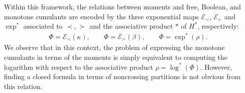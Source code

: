 Within this framework, the relations between moments and free, Boolean, and monotone cumulants are encoded by the three exponential maps $\mathcal{E}_\prec$, $\mathcal{E}_\succ$ and $\exp^*$ associated to $\prec$, $\succ$ and the associative product $*$ of $H^*$, respectively:
\begin{gather*}
\Phi = \mathcal{E}_\prec(\kappa),
\qquad \Phi = \mathcal{E}_{\succ}(\beta),
\qquad \Phi = \exp^*(\rho).
\end{gather*}
We observe that in this context, the problem of expressing the monotone cumulants in terms of the moments is simply equivalent to computing the logarithm with respect to the associative product $\rho = \log^*(\Phi).$ However, finding a closed formula in terms of noncrossing partitions is not obvious from this relation.

